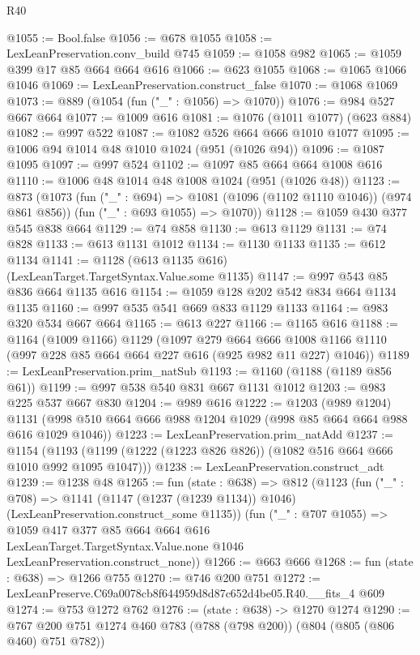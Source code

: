 \begin{lexlean}{R40}
\begin{coremodule}
@1055 := Bool.false
@1056 := @678 @1055
@1058 := LexLeanPreservation.conv_build @745
@1059 := @1058 @982
@1065 := @1059 @399 @17 @85 @664 @664 @616
@1066 := @623 @1055
@1068 := @1065 @1066 @1046
@1069 := LexLeanPreservation.construct_false
@1070 := @1068 @1069
@1073 := @889 (@1054 (fun ("_" : @1056) => @1070))
@1076 := @984 @527 @667 @664
@1077 := @1009 @616
@1081 := @1076 (@1011 @1077) (@623 @884)
@1082 := @997 @522
@1087 := @1082 @526 @664 @666 @1010 @1077
@1095 := @1006 @94 @1014 @48 @1010 @1024 (@951 (@1026 @94))
@1096 := @1087 @1095
@1097 := @997 @524
@1102 := @1097 @85 @664 @664 @1008 @616
@1110 := @1006 @48 @1014 @48 @1008 @1024 (@951 (@1026 @48))
@1123 := @873
    (@1073
      (fun ("_" : @694) => @1081 (@1096 (@1102 @1110 @1046)) (@974 @861 @856))
      (fun ("_" : @693 @1055) => @1070))
@1128 := @1059 @430 @377 @545 @838 @664
@1129 := @74 @858
@1130 := @613 @1129
@1131 := @74 @828
@1133 := @613 @1131 @1012
@1134 := @1130 @1133
@1135 := @612 @1134
@1141 := @1128 (@613 @1135 @616) (LexLeanTarget.TargetSyntax.Value.some @1135)
@1147 := @997 @543 @85 @836 @664 @1135 @616
@1154 := @1059 @128 @202 @542 @834 @664 @1134 @1135
@1160 := @997 @535 @541 @669 @833 @1129 @1133
@1164 := @983 @320 @534 @667 @664
@1165 := @613 @227
@1166 := @1165 @616
@1188 := @1164
    (@1009 @1166)
    @1129
    (@1097
      @279
      @664
      @666
      @1008
      @1166
      @1110
      (@997 @228 @85 @664 @664 @227 @616 (@925 @982 @11 @227) @1046))
@1189 := LexLeanPreservation.prim_natSub
@1193 := @1160 (@1188 (@1189 @856 @61))
@1199 := @997 @538 @540 @831 @667 @1131 @1012
@1203 := @983 @225 @537 @667 @830
@1204 := @989 @616
@1222 := @1203
    (@989 @1204)
    @1131
    (@998 @510 @664 @666 @988 @1204 @1029 (@998 @85 @664 @664 @988 @616 @1029 @1046))
@1223 := LexLeanPreservation.prim_natAdd
@1237 := @1154
    (@1193 (@1199 (@1222 (@1223 @826 @826)) (@1082 @516 @664 @666 @1010 @992 @1095 @1047)))
@1238 := LexLeanPreservation.construct_adt
@1239 := @1238 @48
@1265 := fun (state : @638) =>
  @812
    (@1123
      (fun ("_" : @708) =>
      @1141 (@1147 (@1237 (@1239 @1134)) @1046) (LexLeanPreservation.construct_some @1135))
      (fun ("_" : @707 @1055) =>
      @1059
        @417
        @377
        @85
        @664
        @664
        @616
        LexLeanTarget.TargetSyntax.Value.none
        @1046
        LexLeanPreservation.construct_none))
@1266 := @663 @666
@1268 := fun (state : @638) => @1266 @755
@1270 := @746 @200 @751
@1272 := LexLeanPreserve.C69a0078cb8f644959d8d87c652d4be05.R40.__fits_4 @609
@1274 := @753 @1272 @762
@1276 := (state : @638) -> @1270 @1274
@1290 := @767 @200 @751 @1274 @460 @783 (@788 (@798 @200)) (@804 (@805 (@806 @460) @751 @782))

\end{coremodule}
\end{lexlean}
